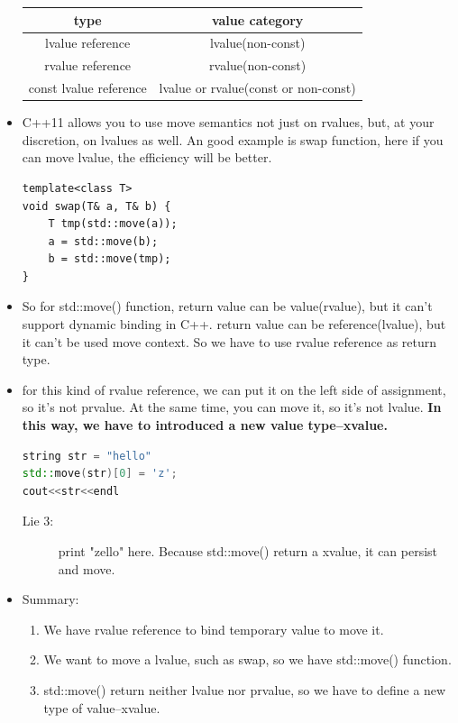 \documentclass[a4paper,11pt,twoside]{book}
\newcommand{\tophline}{\hline }
\newcommand{\bottomhline}{\\ \hline }
\newcommand{\tophline}{ }
\newcommand{\bottomhline}{ }
\begin{document}
\begin{itemize}
	\begin{tabular}{|c|c|}
		\tophline 
		type & value category \\ 
		\tophline 
		lvalue reference & lvalue(non-const)  \\ 
		\tophline 
		rvalue reference &  rvalue(non-const)\\ 
		\tophline 
		const lvalue reference & lvalue or rvalue(const or non-const)  \bottomhline 
	\end{tabular} 
	
	\item C++11 allows you to use move semantics not just on rvalues, but, at your discretion, on lvalues as well. An good example is swap function, here if you can move lvalue, the efficiency will be better. 
	
\begin{lstlisting}[numbers=none]
template<class T> 
void swap(T& a, T& b) { 
	T tmp(std::move(a));
	a = std::move(b); 
	b = std::move(tmp);
} 
\end{lstlisting}
	
	\item So for std::move() function, return value can be value(rvalue), but it can't support dynamic binding in C++.  return value can be reference(lvalue), but it can't be used move context. So we have to use rvalue reference as return type. 
	
	\item for this kind of rvalue reference, we can put it on the left side of assignment, so it's not prvalue. At the same time, you can move it, so it's not lvalue.  \textbf{In this way, we have to introduced a new value type--xvalue.}    
\begin{lstlisting}[frame=single, language=c++, mathescape=true]
string str = "hello"
std::move(str)[0] = 'z';
cout<<str<<endl 
\end{lstlisting}
\begin{description}
	\item[Lie 3:] print "zello" here. Because std::move() return a xvalue, it can persist and move.
\end{description}
	
	\item Summary:
	\begin{enumerate}
		\item We have rvalue reference to bind temporary value to move it.
		\item We want to move a lvalue, such as swap, so we have std::move() function.
		\item std::move() return neither lvalue nor prvalue, so we have to define a new type of value--xvalue.
	\end{enumerate}


\end{itemize}
\end{document}
